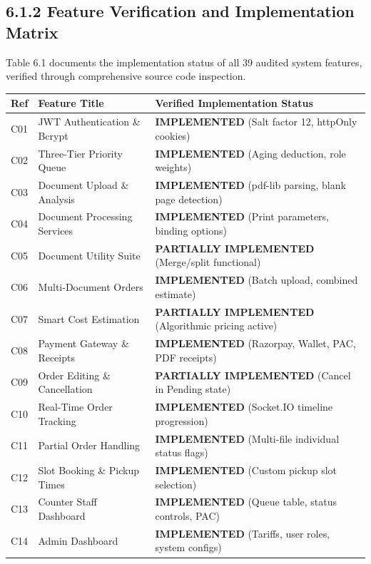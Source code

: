 \documentclass[12pt,a4paper,oneside]{report}
\begin{document}
\subsection{6.1.2 Feature Verification and Implementation Matrix}
Table 6.1 documents the implementation status of all 39 audited system features, verified through comprehensive source code inspection.

\begin{table}[H]
\centering
\small
\begin{tabularx}{\textwidth}{|p{0.55in}|p{1.9in}|X|}
\hline
\textbf{Ref} & \textbf{Feature Title} & \textbf{Verified Implementation Status} \\ \hline
C01 & JWT Authentication \& Bcrypt & \textbf{IMPLEMENTED} (Salt factor 12, httpOnly cookies) \\ \hline
C02 & Three-Tier Priority Queue & \textbf{IMPLEMENTED} (Aging deduction, role weights) \\ \hline
C03 & Document Upload \& Analysis & \textbf{IMPLEMENTED} (pdf-lib parsing, blank page detection) \\ \hline
C04 & Document Processing Services & \textbf{IMPLEMENTED} (Print parameters, binding options) \\ \hline
C05 & Document Utility Suite & \textbf{PARTIALLY IMPLEMENTED} (Merge/split functional) \\ \hline
C06 & Multi-Document Orders & \textbf{IMPLEMENTED} (Batch upload, combined estimate) \\ \hline
C07 & Smart Cost Estimation & \textbf{PARTIALLY IMPLEMENTED} (Algorithmic pricing active) \\ \hline
C08 & Payment Gateway \& Receipts & \textbf{IMPLEMENTED} (Razorpay, Wallet, PAC, PDF receipts) \\ \hline
C09 & Order Editing \& Cancellation & \textbf{PARTIALLY IMPLEMENTED} (Cancel in Pending state) \\ \hline
C10 & Real-Time Order Tracking & \textbf{IMPLEMENTED} (Socket.IO timeline progression) \\ \hline
C11 & Partial Order Handling & \textbf{IMPLEMENTED} (Multi-file individual status flags) \\ \hline
C12 & Slot Booking \& Pickup Times & \textbf{IMPLEMENTED} (Custom pickup slot selection) \\ \hline
C13 & Counter Staff Dashboard & \textbf{IMPLEMENTED} (Queue table, status controls, PAC) \\ \hline
C14 & Admin Dashboard & \textbf{IMPLEMENTED} (Tariffs, user roles, system configs) \\ \hline

\end{tabularx}
\end{table}
\end{document}
